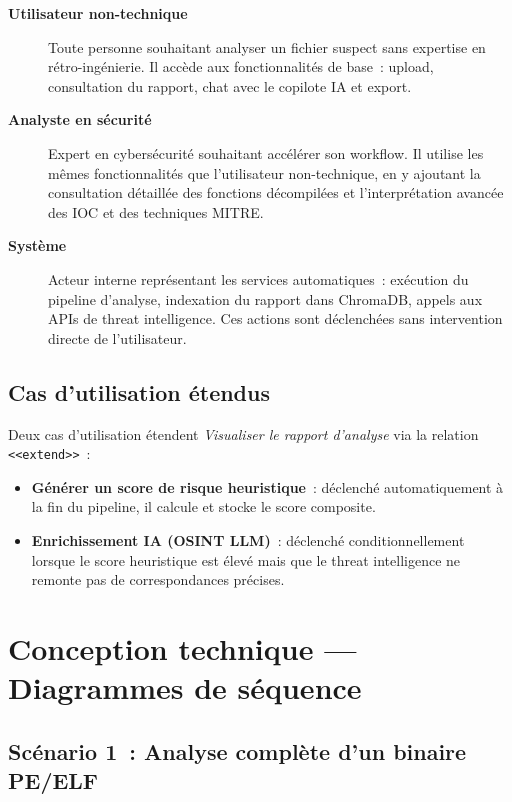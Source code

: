 \begin{description}
  \item[\textbf{Utilisateur non-technique}] Toute personne souhaitant analyser un fichier suspect sans expertise en rétro-ingénierie. Il accède aux fonctionnalités de base~: upload, consultation du rapport, chat avec le copilote IA et export.

  \item[\textbf{Analyste en sécurité}] Expert en cybersécurité souhaitant accélérer son workflow. Il utilise les mêmes fonctionnalités que l'utilisateur non-technique, en y ajoutant la consultation détaillée des fonctions décompilées et l'interprétation avancée des IOC et des techniques MITRE.

  \item[\textbf{Système}] Acteur interne représentant les services automatiques~: exécution du pipeline d'analyse, indexation du rapport dans ChromaDB, appels aux APIs de threat intelligence. Ces actions sont déclenchées sans intervention directe de l'utilisateur.
\end{description}

\subsection{Cas d'utilisation étendus}

Deux cas d'utilisation étendent \textit{Visualiser le rapport d'analyse} via la relation \texttt{<<extend>>}~:
\begin{itemize}
  \item \textbf{Générer un score de risque heuristique}~: déclenché automatiquement à la fin du pipeline, il calcule et stocke le score composite.
  \item \textbf{Enrichissement IA (OSINT LLM)}~: déclenché conditionnellement lorsque le score heuristique est élevé mais que le threat intelligence ne remonte pas de correspondances précises.
\end{itemize}

\section{Conception technique --- Diagrammes de séquence}

\subsection{Scénario 1~: Analyse complète d'un binaire PE/ELF}

